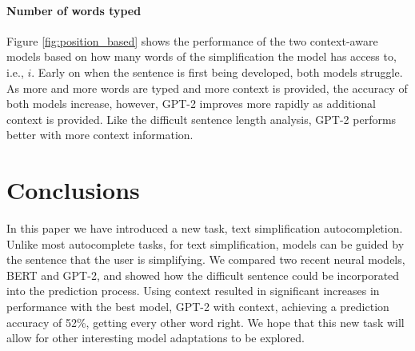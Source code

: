 \documentclass[11pt,a4paper]{article}
\begin{document}
\vspace{-1mm}
\paragraph{Number of words typed}
Figure \ref{fig:position_based} shows the performance of the two context-aware models based on how many words of the simplification the model has access to, i.e., $i$.  Early on when the sentence is first being developed, both models struggle.  As more and more words are typed and more context is provided, the accuracy of both models increase, however, GPT-2 improves more rapidly as additional context is provided. Like the difficult sentence length analysis, GPT-2 performs better with more context information.



\section{Conclusions}

In this paper we have introduced a new task, text simplification autocompletion.  Unlike most autocomplete tasks, for text simplification, models can be guided by the sentence that the user is simplifying.  We compared two recent neural models, BERT and GPT-2, and showed how the difficult sentence could be incorporated into the prediction process.  Using context resulted in significant increases in performance with the best model, GPT-2 with context, achieving a prediction accuracy of 52\%, getting every other word right.  We hope that this new task will allow for other interesting model adaptations to be explored.




\end{document}
